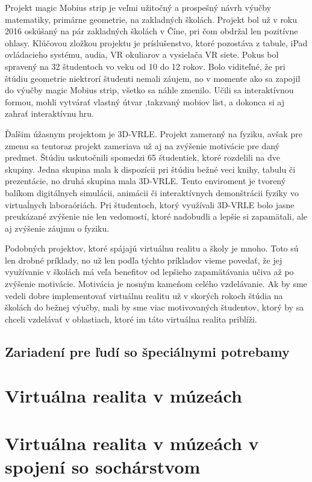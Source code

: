 \documentclass[10pt,twoside,slovak,a4paper]{article}
\begin{document}
Projekt magic Mobius strip je veľmi užitočný a prospešný návrh výučby matematiky, primárne geometrie, na zakladných školách. Projekt bol už v roku 2016 oskúšaný na pár zakladných školách v Číne, pri čom obdržal len pozitívne ohlasy. Klúčovou zložkou projektu je príslušenstvo, ktoré pozostáva z tabule, iPad ovládacieho systému, audia, VR okuliarov a vysielača VR siete. Pokus bol spravený na 32 študentoch vo veku od 10 do 12 rokov. Bolo viditeľné, že pri štúdiu geometrie niektrorí študenti nemali záujem, no v momente ako sa zapojil do výučby magic Mobius strip, všetko sa náhle zmenilo. Učili sa interaktívnou formou, mohli vytvárať vlastný útvar ,takzvaný mobiov list, a dokonca si aj zahrať interaktívnu hru.~\cite{Math}

Ďalšim úžasnym projektom je 3D-VRLE. Projekt zameraný na fyziku, avšak pre zmenu sa tentoraz projekt zameriava už aj na zvýšenie motivácie pre daný predmet. Štúdiu uskutočnili spomedzi 65 študentiek, ktoré rozdelili na dve skupiny. Jedna skupina mala k dispozícii pri štúdiu bežné veci knihy, tabulu či prezentácie, no druhá skupina mala 3D-VRLE. Tento enviroment je tvorený balíkom digitálnych simulácii, animácii či interaktívnych demonštrácii fyziky vo virtuaĺnych laboraóriách. Pri študentoch, ktorý využívali 3D-VRLE bolo jasne preukázané zvýšenie nie len vedomostí, ktoré nadobudli a lepšie si zapamätali, ale aj zvýšenie záujmu o fyziku.~\cite{Physics} 

Podobných projektov, ktoré spájajú virtuálnu realitu a školy je mnoho. Toto sú len drobné príklady, no už len podľa týchto príkladov vieme povedať, že jej využívanie v školách má veľa benefitov od lepšieho zapamätávania učiva až po zvýšenie motivácie. Motivácia je nosným kameňom celého vzdelávanie. Ak by sme vedeli dobre implementovať virtuálnu realitu už v skorých rokoch štúdia na školách do bežnej výučby, mali by sme viac motivovaných študentov, ktorý by sa chceli vzdelávať v oblastiach, ktoré im táto virtuálna realita priblíži.  


\subsection{Zariadení pre ľudí so špeciálnymi potrebamy} \label{školy:zariadenia}


\section{Virtuálna realita v múzeách} \label{muzea}


\section{Virtuálna realita v múzeách v spojení so sochárstvom} \label{produkt}
\end{document}
